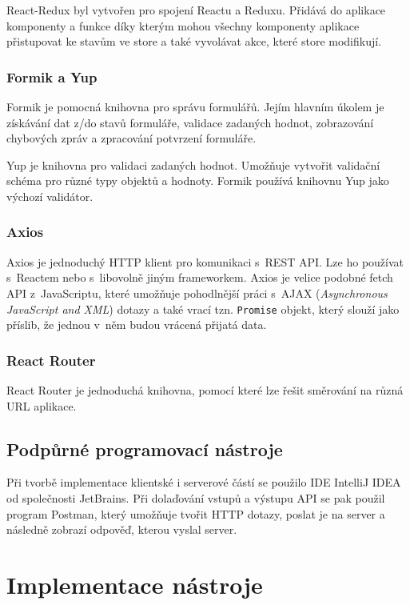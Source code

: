React-Redux byl vytvořen pro spojení Reactu a Reduxu. Přidává do aplikace komponenty a funkce díky kterým mohou všechny komponenty aplikace přistupovat ke stavům ve store a také vyvolávat akce, které store modifikují.

\subsubsection *{Formik a Yup}

Formik je pomocná knihovna pro správu formulářů. Jejím hlavním úkolem je získávání dat z/do stavů formuláře, validace zadaných hodnot, zobrazování chybových zpráv a zpracování potvrzení formuláře. 

Yup je knihovna pro validaci zadaných hodnot. Umožňuje vytvořit validační schéma pro různé typy objektů a hodnoty. Formik používá knihovnu Yup jako výchozí validátor. 

\subsubsection *{Axios}

Axios je jednoduchý HTTP klient pro komunikaci s~REST API. Lze ho používat s~Reactem nebo s~libovolně jiným frameworkem. Axios je velice podobné fetch API z~JavaScriptu, které umožňuje pohodlnější práci s~AJAX (\textit{Asynchronous JavaScript and XML}) dotazy a také vrací tzn. \texttt{Promise} objekt, který slouží jako příslib, že jednou v~něm budou vrácená přijatá data.

\subsubsection *{React Router}

React Router je jednoduchá knihovna, pomocí které lze řešit směrování na různá URL aplikace.

\subsection{Podpůrné programovací nástroje}

Při tvorbě implementace klientské i serverové částí se použilo IDE IntelliJ IDEA od společnosti JetBrains.
Při dolaďování vstupů a výstupu API se pak použil program Postman, který umožňuje tvořit HTTP dotazy, poslat je na server a následně zobrazí odpověď, kterou vyslal server.


\section{Implementace nástroje}

